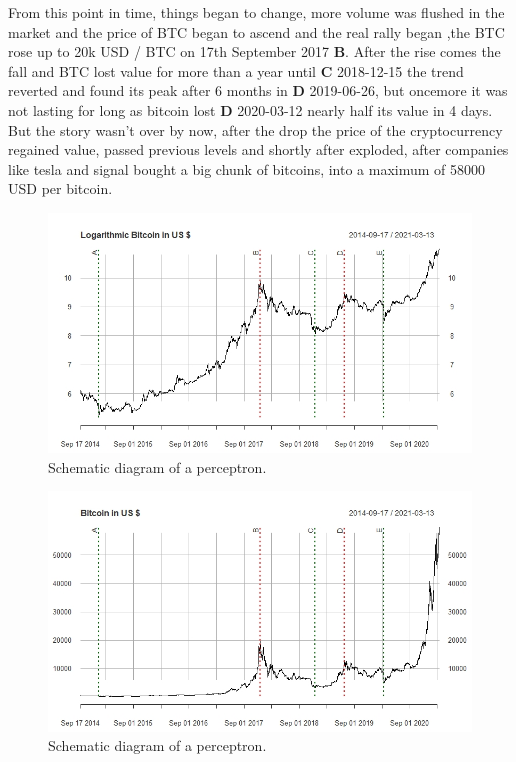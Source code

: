 \documentclass[
]{article}
\begin{document}
From this point in time, things began to change, more volume was flushed
in the market and the price of BTC began to ascend and the real rally
began ,the BTC rose up to 20k USD / BTC on 17th September 2017
\textbf{B}. After the rise comes the fall and BTC lost value for more
than a year until \textbf{C} 2018-12-15 the trend reverted and found its
peak after 6 months in \textbf{D} 2019-06-26, but oncemore it was not
lasting for long as bitcoin lost \textbf{D} 2020-03-12 nearly half its
value in 4 days. But the story wasn't over by now, after the drop the
price of the cryptocurrency regained value, passed previous levels and
shortly after exploded, after companies like tesla and signal bought a
big chunk of bitcoins, into a maximum of 58000 USD per bitcoin.

\newpage

\begin{figure}

{\centering \includegraphics[width=0.8\linewidth]{images/logbtc_usd} 

}

\caption{Schematic diagram of a perceptron.}\label{fig:logprice_btc}
\end{figure}

\begin{figure}

{\centering \includegraphics[width=0.8\linewidth]{images/btc_usd} 

}

\caption{Schematic diagram of a perceptron.}\label{fig:price_btc}
\end{figure}
\end{document}
